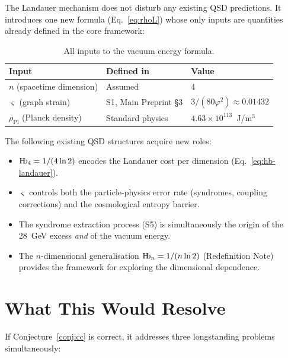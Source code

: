 \documentclass[11pt,a4paper]{article}
\theoremstyle{definition}
\newcommand{\Hb}{\textnormal{H\kern-0.3em b}}
\newcommand{\Hbn}{\Hb_n}
\newcommand{\Hbfour}{\Hb_4}
\newcommand{\strain}{\varsigma}            %
\newcommand{\rhoPl}{\rho_{\text{Pl}}}
\begin{document}
The Landauer mechanism does not disturb any existing QSD predictions. It introduces one new formula (Eq.~\ref{eq:rhoL}) whose only inputs are quantities already defined in the core framework:

\begin{table}[h]
\centering
\begin{tabular}{lll}
\toprule
\textbf{Input} & \textbf{Defined in} & \textbf{Value} \\
\midrule
$n$ (spacetime dimension) & Assumed & 4 \\
$\strain$ (graph strain) & S1, Main Preprint \S3 & $3/(80\varphi^2) \approx 0.01432$ \\
$\rhoPl$ (Planck density) & Standard physics & $4.63 \times 10^{113}$~J/m$^3$ \\
\bottomrule
\end{tabular}
\caption{All inputs to the vacuum energy formula.}
\end{table}

The following existing QSD structures acquire new roles:

\begin{itemize}[nosep]
    \item $\Hbfour = 1/(4\ln 2)$ encodes the Landauer cost per dimension (Eq.~\ref{eq:hb-landauer}).
    \item $\strain$ controls both the particle-physics error rate (syndromes, coupling corrections) and the cosmological entropy barrier.
    \item The syndrome extraction process (S5) is simultaneously the origin of the 28~GeV excess \emph{and} of the vacuum energy.
    \item The $n$-dimensional generalisation $\Hbn = 1/(n\ln 2)$ (Redefinition Note) provides the framework for exploring the dimensional dependence.
\end{itemize}


\section{What This Would Resolve}

If Conjecture~\ref{conj:cc} is correct, it addresses three longstanding problems simultaneously:
\end{document}
